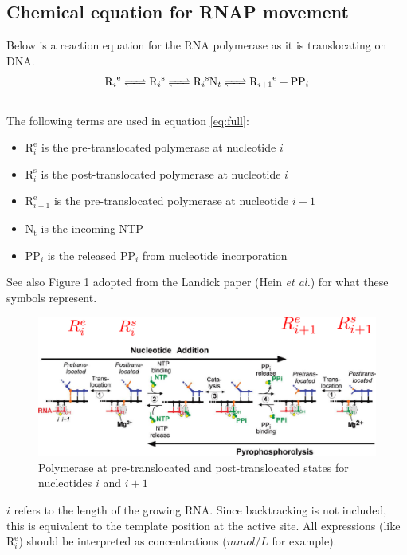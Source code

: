 \documentclass[a4paper]{article}
\newcommand{\te}[1]{\text{#1}}
\begin{document}
 
\noindent

\subsection{Chemical equation for RNAP movement}

Below is a reaction equation for the RNA polymerase as it is translocating on
DNA.
\begin{align}
\ce{R_i^{\text{e}}
<=>
R_i^{\text{s}}
<=>
R_i^{\text{s}}N_t
<=>
R_{i+1}^{\text{e}}
+ PP_i
}
\label{eq:full}
\end{align}
\\
The following terms are used in equation \eqref{eq:full}:
\begin{itemize}
	\item $\te{R}_i^{\te{e}}$ is the pre-translocated polymerase at nucleotide $i$
	\item $\te{R}_i^{\te{s}}$ is the post-translocated polymerase at nucleotide $i$
	\item $\te{R}_{i+1}^{\te{e}}$ is the pre-translocated polymerase at nucleotide $i+1$
	\item $\te{N}_{\te{t}}$ is the incoming NTP
	\item $\te{PP}_i$ is the released $\te{PP}_i$ from nucleotide incorporation
\end{itemize}
See also Figure 1 adopted from the Landick paper (Hein \textit{et al.}) for what these symbols
represent.
\begin{figure}[h]
  \centering
    \includegraphics[scale=0.3]{images/modifiedLandick}
	\caption{Polymerase at pre-translocated and post-translocated states for
	nucleotides $i$ and $i+1$}
\end{figure}

$i$ refers to the length of the growing RNA. Since backtracking is not
included, this is equivalent to the template position at the active site. All
expressions (like $\te{R}_i^{\te{e}}$) should be interpreted as concentrations
($mmol/L$ for example).
\end{document}
